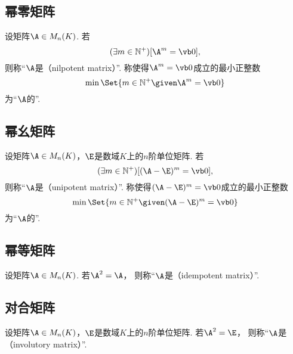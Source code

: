 \subsection{幂零矩阵}
\begin{definition}
设矩阵\(\A \in M_n(K)\).
若\[
	(\exists m\in\mathbb{N}^+)
	[\A^m = \vb0],
\]
则称“\(\A\)是（nilpotent matrix）”.
称使得\(\A^m = \vb0\)成立的最小正整数\[
    \min\Set{ m\in\mathbb{N}^+ \given \A^m = \vb0 }
\]为“\(\A\)的”.
\end{definition}

\subsection{幂幺矩阵}
\begin{definition}
设矩阵\(\A \in M_n(K)\)，\(\E\)是数域\(K\)上的\(n\)阶单位矩阵.
若\[
	(\exists m\in\mathbb{N}^+)
	[(\A-\E)^m=\vb0],
\]
则称“\(\A\)是（unipotent matrix）”.
称使得\((\A-\E)^m=\vb0\)成立的最小正整数\[
    \min\Set{ m\in\mathbb{N}^+ \given (\A-\E)^m=\vb0 }
\]为“\(\A\)的”.
\end{definition}

\subsection{幂等矩阵}
\begin{definition}
设矩阵\(\A \in M_n(K)\).
若\(\A^2=\A\)，
则称“\(\A\)是（idempotent matrix）”.
\end{definition}

\subsection{对合矩阵}
\begin{definition}
设矩阵\(\A \in M_n(K)\)，\(\E\)是数域\(K\)上的\(n\)阶单位矩阵.
若\(\A^2=\E\)，
则称“\(\A\)是（involutory matrix）”.
\end{definition}

